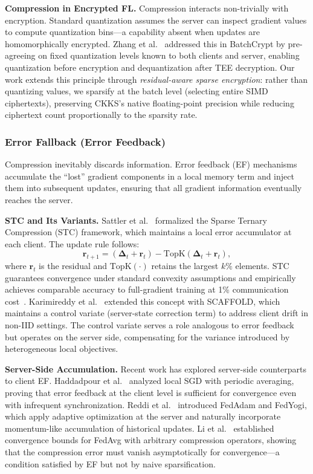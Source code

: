 \textbf{Compression in Encrypted FL.} Compression interacts non-trivially with encryption. Standard quantization assumes the server can inspect gradient values to compute quantization bins---a capability absent when updates are homomorphically encrypted. Zhang et al.~\cite{zhang2020batchcrypt} addressed this in BatchCrypt by pre-agreeing on fixed quantization levels known to both clients and server, enabling quantization before encryption and dequantization after TEE decryption. Our work extends this principle through \textit{residual-aware sparse encryption}: rather than quantizing values, we sparsify at the batch level (selecting entire SIMD ciphertexts), preserving CKKS's native floating-point precision while reducing ciphertext count proportionally to the sparsity rate.

\subsubsection{Error Fallback (Error Feedback)}
\label{subsubsec:error-feedback}

Compression inevitably discards information. Error feedback (EF) mechanisms accumulate the ``lost'' gradient components in a local memory term and inject them into subsequent updates, ensuring that all gradient information eventually reaches the server.

\textbf{STC and Its Variants.} Sattler et al.~\cite{sattler2020robust} formalized the Sparse Ternary Compression (STC) framework, which maintains a local error accumulator at each client. The update rule follows:
\begin{equation}
\mathbf{r}_{t+1} = (\boldsymbol{\Delta}_t + \mathbf{r}_t) - \text{TopK}(\boldsymbol{\Delta}_t + \mathbf{r}_t),
\end{equation}
where $\mathbf{r}_t$ is the residual and $\text{TopK}(\cdot)$ retains the largest $k\%$ elements. STC guarantees convergence under standard convexity assumptions and empirically achieves comparable accuracy to full-gradient training at 1\% communication cost~\cite{sattler2020robust}. Karimireddy et al.~\cite{karimireddy2020scaffold} extended this concept with SCAFFOLD, which maintains a control variate (server-state correction term) to address client drift in non-IID settings. The control variate serves a role analogous to error feedback but operates on the server side, compensating for the variance introduced by heterogeneous local objectives.

\textbf{Server-Side Accumulation.} Recent work has explored server-side counterparts to client EF. Haddadpour et al.~\cite{haddadpour2019local} analyzed local SGD with periodic averaging, proving that error feedback at the client level is sufficient for convergence even with infrequent synchronization. Reddi et al.~\cite{reddi2021adaptive} introduced FedAdam and FedYogi, which apply adaptive optimization at the server and naturally incorporate momentum-like accumulation of historical updates. Li et al.~\cite{li2020convergence} established convergence bounds for FedAvg with arbitrary compression operators, showing that the compression error must vanish asymptotically for convergence---a condition satisfied by EF but not by naive sparsification.

